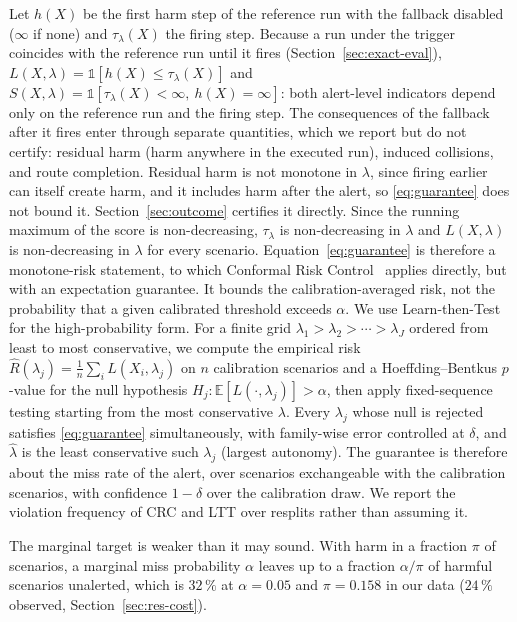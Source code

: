 \documentclass[lettersize,journal]{IEEEtran}
\begin{document}
Let $h(X)$ be the first harm step of the reference run with the
fallback disabled ($\infty$ if none) and $\tau_\lambda(X)$ the firing
step. Because a run under the trigger coincides with the reference run
until it fires (Section~\ref{sec:exact-eval}),
$L(X,\lambda)=\mathbb{1}[h(X)\le\tau_\lambda(X)]$ and
$S(X,\lambda)=\mathbb{1}[\tau_\lambda(X)<\infty,\ h(X)=\infty]$: both
alert-level indicators depend only on the reference run and the firing
step. The consequences of the fallback after it fires enter through
separate quantities, which we report but do not certify: residual harm
(harm anywhere in the executed run), induced collisions, and route
completion. Residual harm is not monotone in $\lambda$, since firing
earlier can itself create harm, and it includes harm after the alert, so
\eqref{eq:guarantee} does not bound it. Section~\ref{sec:outcome} certifies
it directly. Since the running
maximum of the score is non-decreasing, $\tau_\lambda$ is non-decreasing
in $\lambda$ and $L(X,\lambda)$ is non-decreasing in $\lambda$ for every
scenario. Equation~\eqref{eq:guarantee} is therefore a monotone-risk
statement, to which Conformal Risk Control~\cite{crc2022} applies
directly, but with an expectation guarantee. It bounds the calibration-averaged
risk, not the probability that a given calibrated threshold exceeds
$\alpha$. We use Learn-then-Test~\cite{ltt2021} for the
high-probability form. For a finite grid $\lambda_1 > \lambda_2 >
\cdots > \lambda_J$ ordered from least to most conservative, we compute
the empirical risk $\hat R(\lambda_j) = \tfrac{1}{n}\sum_i L(X_i,\lambda_j)$
on $n$ calibration scenarios and a Hoeffding--Bentkus $p$-value for the
null hypothesis $H_j: \mathbb{E}[L(\cdot,\lambda_j)] > \alpha$, then apply
fixed-sequence testing starting from the most conservative $\lambda$.
Every $\lambda_j$ whose null is rejected satisfies
\eqref{eq:guarantee} simultaneously, with family-wise error controlled
at $\delta$, and $\hat\lambda$ is the least conservative such $\lambda_j$
(largest autonomy). The guarantee is therefore about the miss rate of the
alert, over scenarios exchangeable with the calibration scenarios, with
confidence $1-\delta$ over the calibration draw. We report the violation
frequency of CRC and LTT over resplits rather than assuming it.

The marginal target is weaker than it may sound. With harm in a
fraction $\pi$ of scenarios, a marginal miss probability $\alpha$
leaves up to a fraction $\alpha/\pi$ of harmful scenarios unalerted, which is
$32\,\%$ at $\alpha=0.05$ and $\pi=0.158$ in our data ($24\,\%$ observed,
Section~\ref{sec:res-cost}).
\end{document}
